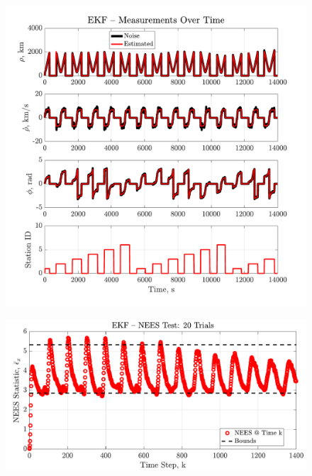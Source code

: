 \documentclass[a4paper]{aiaa-tc}
\begin{document}
  \begin{figure}[H]
 \centering
 \includegraphics[width=\textwidth]{Figures/EKF_measurements.pdf}
 \end{figure}
 
  \begin{figure}[H]
 \centering
 \includegraphics[width=\textwidth]{Figures/EKF_NEES.pdf}
 \end{figure}
 
 
\end{document}
